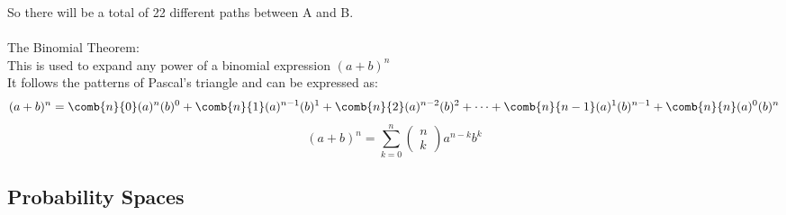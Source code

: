 So there will be a total of 22 different paths between A and B.\\
\\
The Binomial Theorem:\\
This is used to expand any power of a binomial expression $(a+b)^n$\\
It follows the patterns of Pascal's triangle and can be expressed as:
$$(a+b)^n=\comb{n}{0}(a)^n(b)^0+\comb{n}{1}(a)^{n-1}(b)^1+\comb{n}{2}(a)^{n-2}(b)^2+\cdots+\comb{n}{n-1}(a)^1(b)^{n-1}+\comb{n}{n}(a)^0(b)^n$$
$$(a+b)^n=\sum_{k=0}^n\left(\begin{matrix}n\\k\end{matrix}\right)a^{n-k}b^k$$

\subsection{Probability Spaces}
